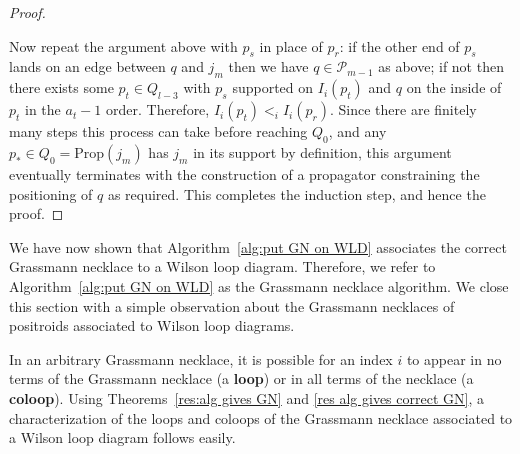 \documentclass[11pt]{article}
\newcommand{\hlfix}[2]{\texthl{#1}\todo{#2}}
\newcommand{\cP}{\mathcal{P}}
\newcommand{\Prop}{\textrm{Prop}}
\theoremstyle{remark}
\theoremstyle{definition}
\begin{document}
\begin{proof}
\begin{figure}
\end{figure}
Now repeat the argument above with $p_s$ in place of $p_r$: if the other end of $p_s$ lands on an edge between $q$ and $j_m$ then we have $q \in \cP_{m-1}$ as above; if not then there exists some $p_t \in Q_{l-3}$ with $p_s$ supported on $I_i(p_t)$ and $q$ on the inside of $p_t$ in the $a_t-1$ order. Therefore, $I_i(p_t) <_i I_i(p_r)$.
Since there are finitely many steps this process can take before reaching $Q_0$, and any $p_* \in Q_0  = \Prop(j_m)$ has $j_m$ in its support by definition, this argument eventually terminates with the construction of a propagator constraining the positioning of $q$ as required. This completes the induction step, and hence the proof.\end{proof}



We have now shown that Algorithm~\ref{alg:put GN on WLD} associates the correct Grassmann necklace to a Wilson loop diagram. Therefore, we refer to Algorithm~\ref{alg:put GN on WLD} as the Grassmann necklace algorithm. We close this section with a simple observation about the Grassmann necklaces of positroids associated to Wilson loop diagrams.


In an arbitrary Grassmann necklace, it is possible for an index $i$ to appear in no terms of the Grassmann necklace (a {\bf loop}) or in all terms of the necklace (a {\bf coloop}). Using Theorems~\ref{res:alg gives GN} and \ref{res alg gives correct GN}, a characterization of the loops and coloops of the Grassmann necklace associated to a Wilson loop diagram follows easily.
\end{document}
